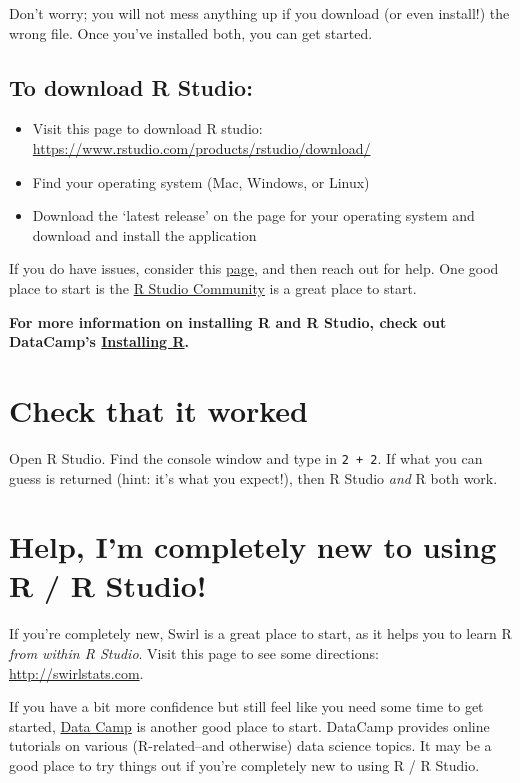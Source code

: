 \documentclass[]{book}
\providecommand{\tightlist}{%
  \setlength{\itemsep}{0pt}\setlength{\parskip}{0pt}}
\begin{document}
Don't worry; you will not mess anything up if you download (or even
install!) the wrong file. Once you've installed both, you can get
started.

\subsection{To download R Studio:}\label{to-download-r-studio}

\begin{itemize}
\tightlist
\item
  Visit this page to download R studio:
  \url{https://www.rstudio.com/products/rstudio/download/}
\item
  Find your operating system (Mac, Windows, or Linux)
\item
  Download the `latest release' on the page for your operating system
  and download and install the application
\end{itemize}

If you do have issues, consider this
\href{https://datacarpentry.org/R-ecology-lesson/}{page}, and then reach
out for help. One good place to start is the
\href{https://community.rstudio.com/}{R Studio Community} is a great
place to start.

\textbf{For more information on installing R and R Studio, check out
DataCamp's
\href{https://www.datacamp.com/community/tutorials/installing-R-windows-mac-ubuntu}{Installing
R}.}

\section{Check that it worked}\label{check-that-it-worked}

Open R Studio. Find the console window and type in \texttt{2\ +\ 2}. If
what you can guess is returned (hint: it's what you expect!), then R
Studio \emph{and} R both work.

\section{Help, I'm completely new to using R / R
Studio!}\label{help-im-completely-new-to-using-r-r-studio}

If you're completely new, Swirl is a great place to start, as it helps
you to learn R \emph{from within R Studio}. Visit this page to see some
directions: \url{http://swirlstats.com}.

If you have a bit more confidence but still feel like you need some time
to get started, \href{https://www.datacamp.com/}{Data Camp} is another
good place to start. DataCamp provides online tutorials on various
(R-related--and otherwise) data science topics. It may be a good place
to try things out if you're completely new to using R / R Studio.
\end{document}
